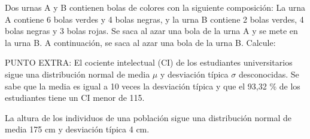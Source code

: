 \documentclass[addpoints,spanish, 12pt,a4paper]{exam}
\begin{document}
\begin{questions}


\question Dos urnas A y B contienen bolas de colores con la siguiente composición: La urna
A contiene 6 bolas verdes y 4 bolas negras, y la urna B contiene 2 bolas verdes, 4
bolas negras y 3 bolas rojas. Se saca al azar una bola de la urna A y se mete en la
urna B. A continuación, se saca al azar una bola de la urna B. Calcule:

\question PUNTO EXTRA: El cociente intelectual (CI) de los estudiantes universitarios sigue una distribución
normal de media $\mu$ y desviación típica $\sigma$ desconocidas. Se sabe que la media es
igual a 10 veces la desviación típica y que el 93,32 \% de los estudiantes tiene un CI
menor de 115.

\question La altura de los individuos de una población sigue una distribución normal de media
175 cm y desviación típica 4 cm.
\end{questions}
\end{document}
